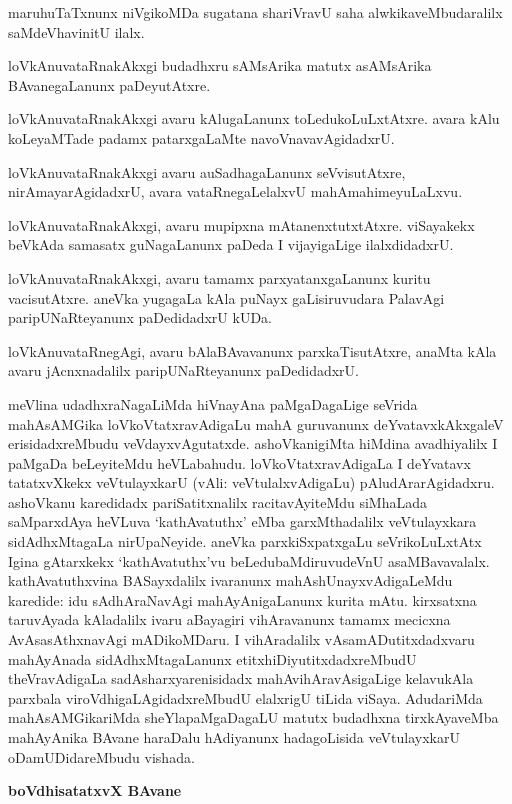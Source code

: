 maruhuTaTxnunx niVgikoMDa sugatana shariVravU saha alwkikaveMbudaralilx saMdeVhavinitU ilalx.

loVkAnuvataRnakAkxgi budadhxru sAMsArika matutx asAMsArika BAvanegaLanunx paDeyutAtxre.

loVkAnuvataRnakAkxgi avaru kAlugaLanunx toLedukoLuLxtAtxre. avara kAlu koLeyaMTade padamx patarxgaLaMte navoVnavavAgidadxrU.

loVkAnuvataRnakAkxgi avaru auSadhagaLanunx seVvisutAtxre, nirAmayarAgidadxrU, avara vataRnegaLelalxvU mahAmahimeyuLaLxvu.

loVkAnuvataRnakAkxgi, avaru mupipxna mAtanenxtutxtAtxre. viSayakekx beVkAda samasatx guNagaLanunx paDeda I vijayigaLige ilalxdidadxrU.

loVkAnuvataRnakAkxgi, avaru tamamx parxyatanxgaLanunx kuritu vacisutAtxre. aneVka yugagaLa kAla puNayx gaLisiruvudara PalavAgi paripUNaRteyanunx paDedidadxrU kUDa.

loVkAnuvataRnegAgi, avaru bAlaBAvavanunx parxkaTisutAtxre, anaMta kAla avaru jAcnxnadalilx paripUNaRteyanunx paDedidadxrU.

meVlina udadhxraNagaLiMda hiVnayAna paMgaDagaLige seVrida mahAsAMGika loVkoVtatxravAdigaLu mahA guruvanunx deYvatavxkAkxgaleV erisidadxreMbudu veVdayx\-vAgu\-tatxde. ashoVkanigiMta hiMdina avadhiyalilx I paMgaDa beLeyiteMdu heVLabahudu. loVkoVtatxravAdigaLa I deYvatavx tatatxvXkekx veVtulayxkarU (vAli: veVtulalxvAdigaLu) pAludArarAgidadxru. ashoVkanu karedidadx pariSatitxnalilx racitavAyiteMdu siMha\-Lada saMparxdAya heVLuva `kathAvatuthx' eMba garxMthadalilx veVtulayxkara sidAdhxMtagaLa nirU\-paNe\-yide. aneVka parxkiSxpatxgaLu seVrikoLuLxtAtx Igina gAtarxkekx `kathAvatuthx'vu beLedubaMdiruvu\-deVnU asaMBavavalalx. kathAvatuthxvina BASayxdalilx ivaranunx mahAshUnayxvAdigaLeMdu karedide: idu sAdhAraNavAgi mahAyAnigaLanunx kurita mAtu. kirxsatxna taruvAyada kAladalilx ivaru aBayagiri vihAravanunx tamamx mecicxna AvAsasAthxnavAgi mADi\-koMDaru. I vihAradalilx vAsamADutitxdadxvaru mahAyAnada sidAdhxMtagaLanunx etitx\-hiDiyutitxdadxreMbudU theVravAdigaLa sadAsharxyarenisidadx mahAvihAravAsigaLige kelavu\-kAla parxbala viroVdhigaLAgidadxreMbudU elalxrigU tiLida viSaya. AdudariMda mahA\-sAMGikariMda sheYlapaMgaDagaLU matutx budadhxna tirxkAyaveMba mahAyAnika BAvane haraDalu hAdiyanunx hadagoLisida veVtulayxkarU oDamUDidareMbudu vishada.

\begin{center}
{\textbf{\Large boVdhisatatxvX BAvane}}
\end{center}

